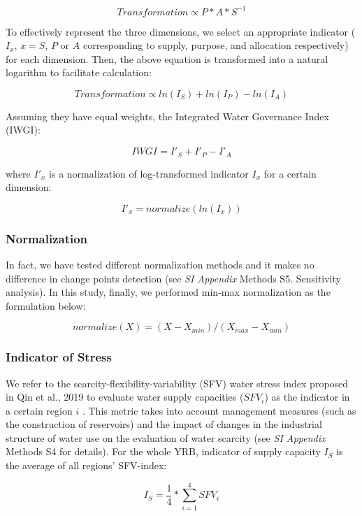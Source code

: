 \documentclass[9pt, twocolumn, twoside, lineno]{pnas-new}
\begin{document}
{	$$ Transformation \propto P*A*S^{-1}$$

	To effectively represent the three dimensions, we select an appropriate indicator ($I_x$, $x=S$, $P$ or $A$ corresponding to supply, purpose, and allocation respectively) for each dimension. Then, the above equation is transformed into a natural logarithm to facilitate calculation:

	$$ Transformation \propto ln(I_S) + ln(I_P) - ln(I_A) $$

	Assuming they have equal weights, the Integrated Water Governance Index (IWGI):

	$$ IWGI = I'_S + I'_P - I'_A $$

	where $I'_x$ is a normalization of log-transformed indicator $I_x$ for a certain dimension:

	$$ I'_x = normalize(ln(I_x)) $$
	
	\subsubsection*{Normalization}
	In fact, we have tested different normalization methods and it makes no difference in change points detection (see \textit{SI Appendix} Methods S5. Sensitivity analysis). In this study, finally, we performed min-max normalization as the formulation below:

	$$ normalize(X) = (X - X_{min}) / (X_{max} - X_{min}) $$

	\subsubsection*{Indicator of Stress}
	We refer to the scarcity-flexibility-variability (SFV) water stress index proposed in Qin et al., 2019 to evaluate water supply capacities ($SFV_i$) as the indicator in a certain region $i$ \cite{qin2019}. This metric takes into account management measures (such as the construction of reservoirs) and the impact of changes in the industrial structure of water use on the evaluation of water scarcity (see \textit{SI Appendix} Methods S4 for details). For the whole YRB, indicator of supply capacity $I_S$ is the average of all regions' SFV-index: 

	$$ I_S = \frac{1}{4} * \sum_{i=1}^4 SFV_{i} $$
	
}
\end{document}
